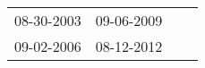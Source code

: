 \begin{supertabular}{llll}
 08-30-2003 &  09-06-2009 \\
 09-02-2006 &  08-12-2012 \\
\end{supertabular}
